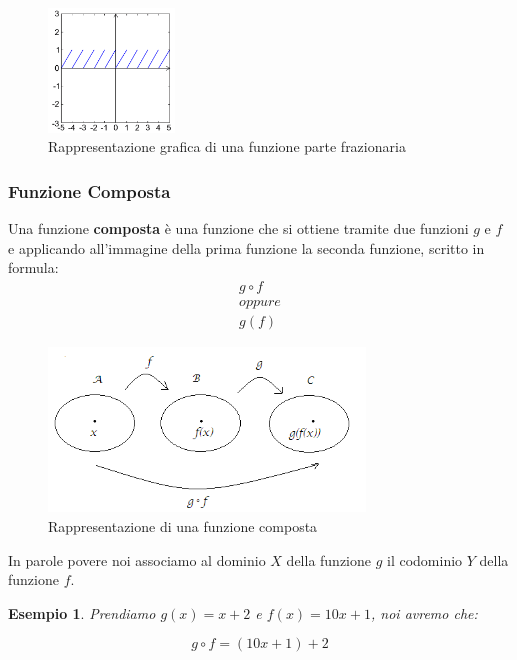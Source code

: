 \documentclass{article}
\newtheorem{exmp}{Esempio}[section]
\begin{document}
\begin{figure}[!h]
        \centering
                \includegraphics[width=0.3\textwidth]{esempio_funzione_parte_frazionaria.png}
                \caption{Rappresentazione grafica di una funzione parte frazionaria}\label{fig:esempio_funzione_parte_frazionaria}
\end{figure}


\subsubsection{Funzione Composta}\label{sec:funzione_composta}
Una funzione \textbf{composta} è una funzione che si ottiene tramite due funzioni $ g $ e $ f $ e applicando all'immagine della prima funzione la seconda funzione, scritto in formula:
\begin{align*}
        g \circ f \\
        oppure \\
        g(f)
\end{align*}

\begin{figure}[h]
        \centering
                \includegraphics[width=0.75\textwidth]{esempio_funzione_composta.png}
                \caption{Rappresentazione di una funzione composta}\label{fig:esempio_funzione_composta}
\end{figure}

In parole povere noi associamo al dominio $ X $ della funzione $ g $ il codominio $ Y $ della funzione $ f $. \par
\begin{exmp}
        Prendiamo $ g(x) = x + 2 $ e $ f(x) = 10x + 1 $, noi avremo che:
                
                \begin{equation*}
                        g \circ f = (10x + 1) + 2
                \end{equation*}
\end{exmp}
\end{document}
